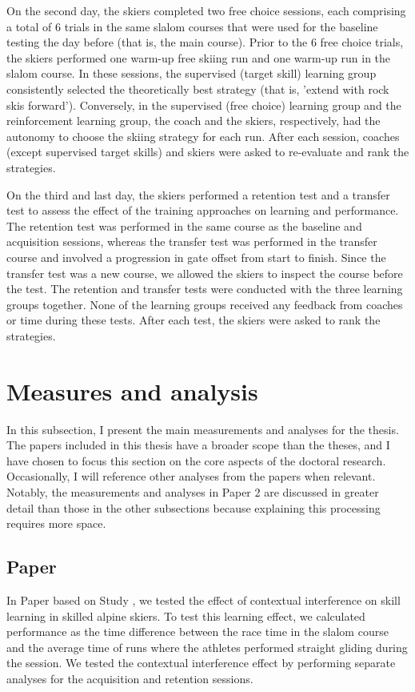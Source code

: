 On the second day, the skiers completed two free choice sessions, each comprising a total of 6 trials in the same slalom courses that were used for the baseline testing the day before (that is, the main course). Prior to the 6 free choice trials, the skiers performed one warm-up free skiing run and one warm-up run in the slalom course. In these sessions, the supervised (target skill) learning group consistently selected the theoretically best strategy (that is, 'extend with rock skis forward'). Conversely, in the supervised (free choice) learning group and the reinforcement learning group, the coach and the skiers, respectively, had the autonomy to choose the skiing strategy for each run. After each session, coaches (except supervised target skills) and skiers were asked to re-evaluate and rank the strategies.

On the third and last day, the skiers performed a retention test and a transfer test to assess the effect of the training approaches on learning and performance. The retention test was performed in the same course as the baseline and acquisition sessions, whereas the transfer test was performed in the transfer course and involved a progression in gate offset from start to finish. Since the transfer test was a new course, we allowed the skiers to inspect the course before the test. The retention and transfer tests were conducted with the three learning groups together. None of the learning groups received any feedback from coaches or time during these tests. After each test, the skiers were asked to rank the strategies.

\section{Measures and analysis}
In this subsection, I present the main measurements and analyses for the thesis. The papers included in this thesis have a broader scope than the theses, and I have chosen to focus this section on the core aspects of the doctoral research. Occasionally, I will reference other analyses from the papers when relevant. Notably, the measurements and analyses in Paper 2 are discussed in greater detail than those in the other subsections because explaining this processing requires more space.

\subsection{Paper }
In Paper  based on Study , we tested the effect of contextual interference on skill learning in skilled alpine skiers. To test this learning effect, we calculated performance as the time difference between the race time in the slalom course and the average time of runs where the athletes performed straight gliding during the session. We tested the contextual interference effect by performing separate analyses for the acquisition and retention sessions.

